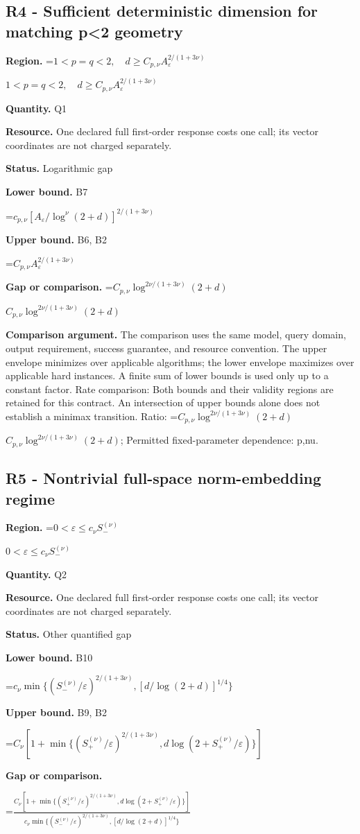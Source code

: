 \documentclass[10pt,a4paper]{article}
\newcommand{\AtlasMath}[1]{\par\begingroup\centering\setbox0=\hbox{$\displaystyle #1$}\ifdim\wd0>1.4\linewidth\typeout{ATLAS WIDE FORMULA: \the\wd0}\fi\ifdim\wd0>\linewidth\resizebox{\linewidth}{!}{\box0}\else\box0\fi\par\endgroup}
\newcommand{\AtlasInlineMath}[1]{\begingroup\setbox0=\hbox{$#1$}\ifdim\wd0>.4\linewidth\endgroup\AtlasMath{#1}\else\endgroup$#1$\fi}
\begin{document}
\subsection{R4 - Sufficient deterministic dimension for matching p<2 geometry}
\textbf{Region.} \AtlasInlineMath{1<p=q<2,\quad d\ge C_{p,\nu}A_\varepsilon^{2/(1+3\nu)}}

\textbf{Quantity.} Q1

\textbf{Resource.} One declared full first-order response costs one call; its vector coordinates are not charged separately.

\textbf{Status.} Logarithmic gap

\textbf{Lower bound.} B7

\AtlasMath{c_{p,\nu}[A_\varepsilon/\log^\nu(2+d)]^{2/(1+3\nu)}}
\textbf{Upper bound.} B6, B2

\AtlasMath{C_{p,\nu}A_\varepsilon^{2/(1+3\nu)}}
\textbf{Gap or comparison.} \AtlasInlineMath{C_{p,\nu}\log^{2\nu/(1+3\nu)}(2+d)}

\textbf{Comparison argument.} The comparison uses the same model, query domain, output requirement, success guarantee, and resource convention. The upper envelope minimizes over applicable algorithms; the lower envelope maximizes over applicable hard instances. A finite sum of lower bounds is used only up to a constant factor. Rate comparison: Both bounds and their validity regions are retained for this contract. An intersection of upper bounds alone does not establish a minimax transition. Ratio: \AtlasInlineMath{C_{p,\nu}\log^{2\nu/(1+3\nu)}(2+d)}; Permitted fixed-parameter dependence: p,nu.

\subsection{R5 - Nontrivial full-space norm-embedding regime}
\textbf{Region.} \AtlasInlineMath{0<\varepsilon\le c_\nu S_-^{(\nu)}}

\textbf{Quantity.} Q2

\textbf{Resource.} One declared full first-order response costs one call; its vector coordinates are not charged separately.

\textbf{Status.} Other quantified gap

\textbf{Lower bound.} B10

\AtlasMath{c_\nu\min\{(S_-^{(\nu)}/\varepsilon)^{2/(1+3\nu)},[d/\log(2+d)]^{1/4}\}}
\textbf{Upper bound.} B9, B2

\AtlasMath{C_\nu[1+\min\{(S_+^{(\nu)}/\varepsilon)^{2/(1+3\nu)},d\log(2+S_+^{(\nu)}/\varepsilon)\}]}
\textbf{Gap or comparison.} 
\AtlasMath{\frac{C_\nu[1+\min\{(S_+^{(\nu)}/\varepsilon)^{2/(1+3\nu)},d\log(2+S_+^{(\nu)}/\varepsilon)\}]}{c_\nu\min\{(S_-^{(\nu)}/\varepsilon)^{2/(1+3\nu)},[d/\log(2+d)]^{1/4}\}}}
\end{document}
